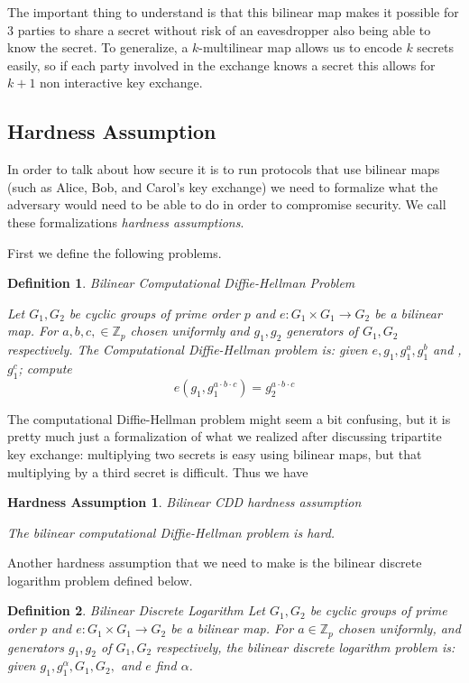 \documentclass[12pt,twoside]{reedthesis}
\newtheorem{definition}{Definition}
\newtheorem{assumption}{Hardness Assumption}
\newcommand{\Z}[0]{\mathbb{Z}}
\begin{document}
\par The important thing to understand is that this bilinear map makes it possible for 3 parties to share a secret without risk of an eavesdropper also being able to know the secret. To generalize, a $k$-multilinear map allows us to encode $k$ secrets easily, so if each party involved in the exchange knows a secret this allows for $k+1$ non interactive key exchange.

    \subsection{Hardness Assumption}
    
    In order to talk about how secure it is to run protocols that use bilinear maps (such as Alice, Bob, and Carol's key exchange) we need to formalize what the adversary would need to be able to do in order to compromise security. We call these formalizations \textit{hardness assumptions}.
    \par First we define the following problems.
    
    \begin{definition}{Bilinear Computational Diffie-Hellman Problem}
    \par Let $G_1,G_2$ be cyclic groups of prime order $p$ and $e:G_1 \times G_1 \to G_2$ be a bilinear map. For $a,b,c,\in \Z_p$ chosen uniformly and $g_1,g_2$ generators of $G_1,G_2$ respectively. The Computational Diffie-Hellman problem is: given $e,g_1,g_1^a,g_1^b$ and ,$g_1^c$; compute $$e(g_1,g_1^{a\cdot b \cdot c}) = g_2^{a\cdot b \cdot c}$$
    \end{definition}
    
    The computational Diffie-Hellman problem might seem a bit confusing, but it is pretty much just a formalization of what we realized after discussing tripartite key exchange: multiplying two secrets is easy using bilinear maps, but that multiplying by a third secret is difficult. Thus we have
    \begin{assumption}{Bilinear CDD hardness assumption}
    \par The bilinear computational Diffie-Hellman problem is hard.
        \end{assumption}
        
        \par Another hardness assumption that we need to make is the bilinear discrete logarithm problem defined below.
       
    \begin{definition}{Bilinear Discrete Logarithm}
    Let $G_1,G_2$ be cyclic groups of prime order $p$ and $e:G_1 \times G_1 \to G_2$ be a bilinear map. For $a \in \Z_p$ chosen uniformly, and generators $g_1,g_2$ of $G_1,G_2$ respectively, the bilinear discrete logarithm problem is: given $g_1,g_1^\alpha, G_1, G_2,$ and $e$ find $\alpha$.
    \end{definition}
    
\end{document}
